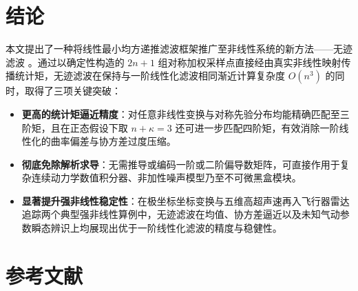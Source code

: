 \section{结论}\label{sec:conclusion}

本文提出了一种将线性最小均方递推滤波框架推广至非线性系统的新方法——无迹滤波 \cite{r08}。通过以确定性构造的 $2n + 1$ 组对称加权采样点直接经由真实非线性映射传播统计矩，无迹滤波在保持与一阶线性化滤波相同渐近计算复杂度 $O(n^3)$ 的同时，取得了三项关键突破：

\begin{itemize}
\item \textbf{更高的统计矩逼近精度}：对任意非线性变换与对称先验分布均能精确匹配至三阶矩，且在正态假设下取 $n + \kappa = 3$ 还可进一步匹配四阶矩，有效消除一阶线性化的曲率偏差与协方差过度压缩。
\item \textbf{彻底免除解析求导}：无需推导或编码一阶或二阶偏导数矩阵，可直接作用于复杂连续动力学数值积分器、非加性噪声模型乃至不可微黑盒模块。
\item \textbf{显著提升强非线性稳定性}：在极坐标坐标变换与五维高超声速再入飞行器雷达追踪两个典型强非线性算例中，无迹滤波在均值、协方差逼近以及未知气动参数瞬态辨识上均展现出优于一阶线性化滤波的精度与稳健性。
\end{itemize}

\section{参考文献}\label{sec:refs}




